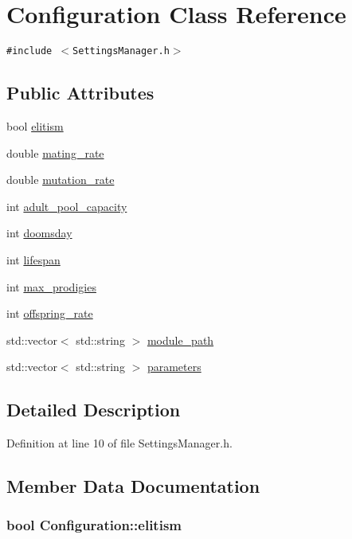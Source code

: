 \hypertarget{classConfiguration}{
\section{Configuration Class Reference}
\label{classConfiguration}
}
{\tt \#include $<$SettingsManager.h$>$}

\subsection*{Public Attributes}
\begin{CompactItemize}
\item 
bool \hyperlink{classConfiguration_268d20703b02a232811c2e6845b7c3a3}{elitism}
\item 
double \hyperlink{classConfiguration_e43c312f9ccfea3cc282216fa64aa18f}{mating\_\-rate}
\item 
double \hyperlink{classConfiguration_4d76d841853c3c44850576d73cafa4c2}{mutation\_\-rate}
\item 
int \hyperlink{classConfiguration_4a45ec1ea02f8e99f41fb79a4615e38f}{adult\_\-pool\_\-capacity}
\item 
int \hyperlink{classConfiguration_d46898d81812dfd7983dfd6e3a507a77}{doomsday}
\item 
int \hyperlink{classConfiguration_858ab0060803795860cfc447e6aa246e}{lifespan}
\item 
int \hyperlink{classConfiguration_be86bbb6446ce51bc97ef683830cea11}{max\_\-prodigies}
\item 
int \hyperlink{classConfiguration_10ea785ff3baedcfb867dffe0acf7b9d}{offspring\_\-rate}
\item 
std::vector$<$ std::string $>$ \hyperlink{classConfiguration_c43157b4be129795ce999da8a09c9797}{module\_\-path}
\item 
std::vector$<$ std::string $>$ \hyperlink{classConfiguration_9d329802f7cd5bc48e278f34168594a7}{parameters}
\end{CompactItemize}


\subsection{Detailed Description}


Definition at line 10 of file SettingsManager.h.

\subsection{Member Data Documentation}
\hypertarget{classConfiguration_268d20703b02a232811c2e6845b7c3a3}{
\subsubsection{\setlength{\rightskip}{0pt plus 5cm}bool {\bf Configuration::elitism}}}
\label{classConfiguration_268d20703b02a232811c2e6845b7c3a3}




